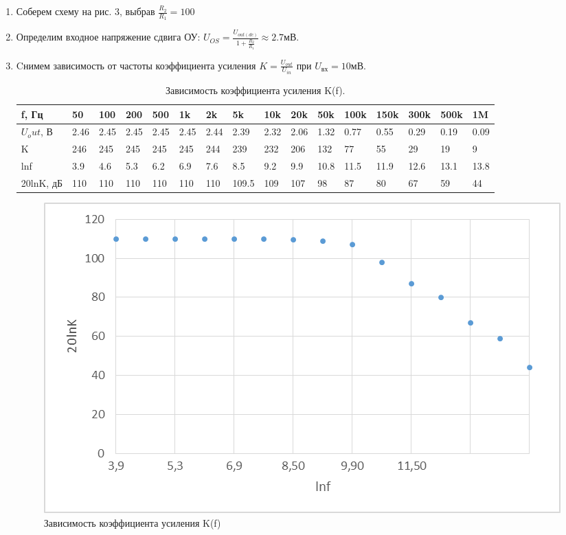 \documentclass[a4paper]{article}
\begin{document}
\begin{enumerate}
\item Соберем схему на рис. 3, выбрав $\frac{R_2}{R_1} = 100$
 
\item Определим входное напряжение сдвига ОУ: $U_{OS} =\frac{U_{out(dc)}}{1+\frac{R_2}{R_1}} \approx 2.7 мВ$.
\item Cнимем зависимость от частоты коэффициента усиления $K = \frac{U_{out}}{U_{in}}$ при $U_{вх} = 10мВ$.

\begin{table}[H]
    \centering
    \begin{center}
    \end{center}
    \vspace{0.1cm}
    \label{tab:my_label}
    \begin{tabular}{|p{2cm}|p{1cm}|p{1cm}|p{1cm}|p{1cm}|p{1cm}|p{1cm}|p{1cm}|p{1cm}|p{1cm}|p{1cm}|p{1cm}|p{1cm}|p{1cm}|p{1cm}|p{1cm}|}
        \hline
        f, Гц & 50    & 100   & 200 & 500 & 1k    & 2k    & 5k    & 10k    & 20k    & 50k  & 100k & 150k &300k &500k & 1M \\ 
        \hline
        $U_out$, В  & 2.46 & 2.45 & 2.45 & 2.45  & 2.45  & 2.44  & 2.39  & 2.32   & 2.06  & 1.32 & 0.77  & 0.55 & 0.29 & 0.19 & 0.09\\
        \hline
        K    & 246 & 245 & 245  & 245  & 245   & 244   & 239    & 232    & 206   & 132 & 77 & 55 &  29 & 19 & 9 \\
        \hline
        lnf     & 3.9   & 4.6  & 5.3  & 6.2 & 6.9  & 7.6 & 8.5   & 9.2  & 9.9 &  10.8 & 11.5 & 11.9 & 12.6 & 13.1 & 13.8 \\
        \hline
        20lnK, дБ   & 110   & 110  & 110 & 110 &  110  & 110  & 109.5 &  109 & 107  & 98 & 87 & 80 & 67 & 59 & 44 \\
        \hline 
        \end{tabular}
        \caption{Зависимость коэффициента усиления K(f).}
\end{table}


\begin{figure}[H]
    \begin{center}
        \includegraphics[scale = 0.6]{диаграмма_2.png}
        \caption{Зависимость коэффициента усиления K(f)}
        \label{Sallen-Ki}
    \end{center}
\end{figure}


\end{enumerate}
\end{document}
